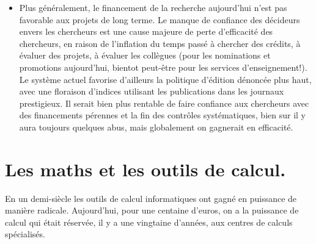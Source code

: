 \documentclass[a4paper,11pt]{book}
\begin{document}
\begin{giacjshere}
\begin{itemize}
patrimomiaux sur un logiciel c'est l'employeur de l'auteur et
pas l'auteur lui-m\^eme, or les responsables de projets,
universit\'es et autres organismes
publics de recherche sont beaucoup plus r\'eticentes au logiciel
libre que les auteurs eux-m\^emes ... surtout s'ils ont des organismes
de valorisation. Ce n'est pas seulement une question financi\`ere
mais tout simplement de qui controle quoi, une fois un logiciel
lib\'er\'e, le contr\^ole est dans les mains des personnes qui codent,
et \'echappe aux services de valorisation ou aux scientifiques
qui dirigent le projet (ainsi Allan Steel, le principal codeur du logiciel 
Magma, dont l'attractivit\'e doit tout au g\'enie algorithmique de cet
auteur, n'apparait m\^eme pas dans la citation recommend\'ee
du logiciel).
\item Plus g\'en\'eralement, le financement de la recherche
aujourd'hui n'est pas favorable aux projets de long terme.
Le manque de confiance des d\'ecideurs envers les chercheurs
est une cause majeure de perte d'efficacit\'e des chercheurs,
en raison de l'inflation du temps pass\'e \`a chercher des cr\'edits,
\`a \'evaluer des projets, \`a \'evaluer les coll\`egues
(pour les nominations et promotions aujourd'hui, bientot peut-\^etre pour les services
d'enseignement!). Le syst\`eme actuel favorise d'ailleurs la politique
d'\'edition d\'enonc\'ee plus haut, avec une floraison d'indices utilisant
les publications dans les journaux prestigieux. Il serait bien plus
rentable de faire confiance aux chercheurs avec des financements
p\'erennes et la fin des contr\^oles syst\'ematiques, bien sur il y aura
toujours quelques abus, mais globalement on gagnerait en efficacit\'e.
\end{itemize}

\section{Les maths et les outils de calcul.}
En un demi-si\`ecle les outils de calcul informatiques ont
gagn\'e en puissance de mani\`ere radicale. Aujourd'hui,
pour une centaine d'euros, on a la puissance de calcul
qui \'etait r\'eserv\'ee, il y a une vingtaine d'ann\'ees, 
aux centres de calculs sp\'ecialis\'es. 


\end{giacjshere}
\end{document}
